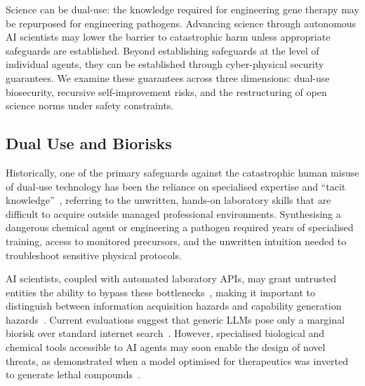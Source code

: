 \documentclass[11pt, a4paper, twocolumn, goog]{google}
\begin{document}
Science can be dual-use: the knowledge required for engineering gene therapy may be repurposed for engineering pathogens. Advancing science through autonomous AI scientists may lower the barrier to catastrophic harm unless appropriate safeguards are established. Beyond establishing safeguards at the level of individual agents, they can be established through cyber-physical security guarantees. We examine these guarantees across three dimensions: dual-use biosecurity, recursive self-improvement risks, and the restructuring of open science norms under safety constraints.

\subsection{Dual Use and Biorisks}

Historically, one of the primary safeguards against the catastrophic human misuse of dual-use technology has been the reliance on specialised expertise and ``tacit knowledge''~\citep{collins2019tacit}, referring to the unwritten, hands-on laboratory skills that are difficult to acquire outside managed professional environments. Synthesising a dangerous chemical agent or engineering a pathogen required years of specialised training, access to monitored precursors, and the unwritten intuition needed to troubleshoot sensitive physical protocols.

AI scientists, coupled with automated laboratory APIs, may grant untrusted entities the ability to bypass these bottlenecks~\citep{soice2023can, zhang2025generative}, making it important to distinguish between information acquisition hazards and capability generation hazards~\citep{sandbrink2023artificial}. Current evaluations suggest that generic LLMs pose only a marginal biorisk over standard internet search~\citep{mouton2023operational, mouton2024operational}. However, specialised biological and chemical tools accessible to AI agents may soon enable the design of novel threats, as demonstrated when a model optimised for therapeutics was inverted to generate lethal compounds~\citep{urbina2022dual}.
\end{document}
